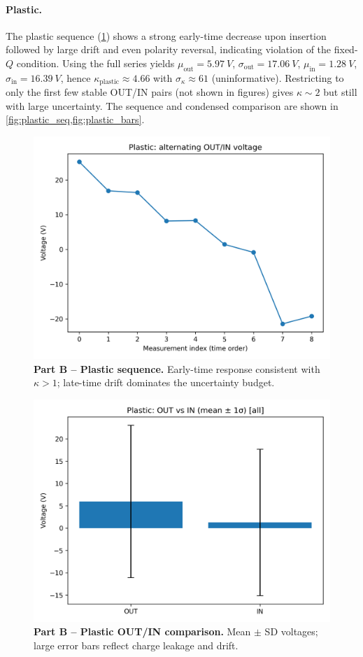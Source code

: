 \documentclass[12pt]{article}
\begin{document}
\paragraph{Plastic.}
The plastic sequence (\cref{fig:plastic_seq}) shows a strong early-time decrease upon insertion followed by large drift and even polarity reversal, indicating violation of the fixed-\(Q\) condition. Using the full series yields \(\mu_{\text{out}}=\SI{5.97}{V}\), \(\sigma_{\text{out}}=\SI{17.06}{V}\), \(\mu_{\text{in}}=\SI{1.28}{V}\), \(\sigma_{\text{in}}=\SI{16.39}{V}\), hence \(\kappa_{\text{plastic}}\approx 4.66\) with \(\sigma_\kappa\approx 61\) (uninformative). Restricting to only the first few stable OUT/IN pairs (not shown in figures) gives \(\kappa\sim 2\) but still with large uncertainty. The sequence and condensed comparison are shown in \cref{fig:plastic_seq,fig:plastic_bars}.

\begin{figure}[htbp]
\centering
\includegraphics[width=0.70\linewidth]{PartB_plastic.png}
\caption{\textbf{Part B -- Plastic sequence.} Early-time response consistent with \(\kappa>1\); late-time drift dominates the uncertainty budget.}
\label{fig:plastic_seq}
\end{figure}

\begin{figure}[htbp]
\centering
\includegraphics[width=0.58\linewidth]{PartB_OUTIN_bars_plastic_all.png}
\caption{\textbf{Part B -- Plastic OUT/IN comparison.} Mean \(\pm\) SD voltages; large error bars reflect charge leakage and drift.}
\label{fig:plastic_bars}
\end{figure}
\FloatBarrier
\end{document}
